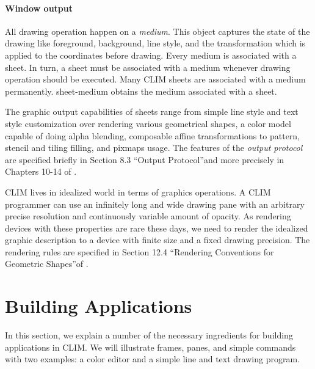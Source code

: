 \documentclass[twocolumn,a4paper]{article}
\newcommand {\concept} [1] {{\sl #1}\index{#1}}
\newcommand {\code}[1]{{\sffamily #1}}
\newcommand {\CLIM}{{\small CLIM}}
\begin{document}
\paragraph*{Window output}

All drawing operation happen on a \concept{medium}. This object captures the state of the drawing like foreground, background, line style, and the transformation which is applied to the coordinates before drawing. Every medium is associated with a sheet. In turn, a sheet must be associated with a medium whenever drawing operation should be executed. Many \CLIM{} sheets are associated with a medium permanently. \code{sheet-medium} obtains the medium associated with a sheet.%

The graphic output capabilities of sheets range from simple line style and text style customization over rendering various geometrical shapes, a color model capable of doing alpha blending, composable affine transformations to pattern, stencil and tiling filling, and pixmaps usage. The features of the \concept{output protocol} are specified briefly in Section 8.3 ``Output Protocol''and more precisely in Chapters 10-14 of \cite{clim-spec}.

\CLIM{} lives in idealized world in terms of graphics operations. A \CLIM{} programmer can use an infinitely long and wide drawing pane with an arbitrary precise resolution and continuously variable amount of opacity. As rendering devices with these properties are rare these days, we need to render the idealized graphic description to a device with finite size and a fixed drawing precision. The rendering rules are specified in Section 12.4 ``Rendering Conventions for Geometric Shapes''of \cite{clim-spec}.

\section{Building Applications}
In this section, we explain a number of the necessary ingredients for building applications in \CLIM{}. We will illustrate frames, panes, and simple commands with two examples: a color editor and a simple line and text drawing program.
\end{document}
